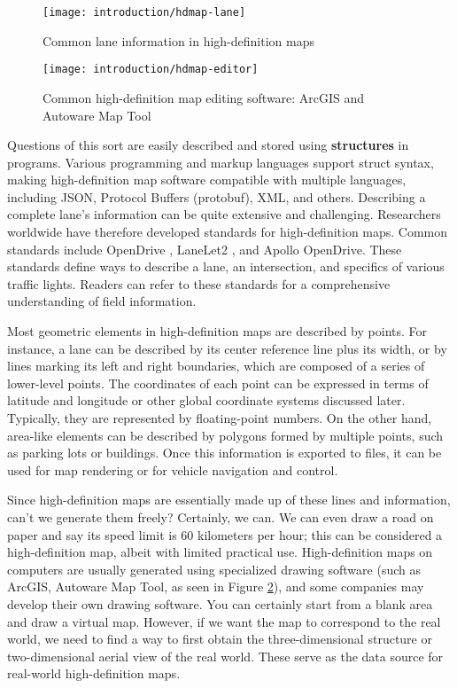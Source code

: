 \begin{figure}[!t]
	\centering
	\texttt{[image: introduction/hdmap-lane]}
	\caption{Common lane information in high-definition maps}
	\label{fig:hdmap-lane}
\end{figure}

\begin{figure}[!t]
	\centering
	\texttt{[image: introduction/hdmap-editor]}
	\caption{Common high-definition map editing software: ArcGIS and Autoware Map Tool}
	\label{fig:hdmap-editor}
\end{figure}

Questions of this sort are easily described and stored using \textbf{structures} in programs. Various programming and markup languages support struct syntax, making high-definition map software compatible with multiple languages, including JSON, Protocol Buffers (protobuf), XML, and others. Describing a complete lane's information can be quite extensive and challenging. Researchers worldwide have therefore developed standards for high-definition maps. Common standards include OpenDrive \cite{Dupuis2010}, LaneLet2 \cite{Poggenhans2018}, and Apollo OpenDrive. These standards define ways to describe a lane, an intersection, and specifics of various traffic lights. Readers can refer to these standards for a comprehensive understanding of field information.

Most geometric elements in high-definition maps are described by points. For instance, a lane can be described by its center reference line plus its width, or by lines marking its left and right boundaries, which are composed of a series of lower-level points. The coordinates of each point can be expressed in terms of latitude and longitude or other global coordinate systems discussed later. Typically, they are represented by floating-point numbers. On the other hand, area-like elements can be described by polygons formed by multiple points, such as parking lots or buildings. Once this information is exported to files, it can be used for map rendering or for vehicle navigation and control.

Since high-definition maps are essentially made up of these lines and information, can't we generate them freely? Certainly, we can. We can even draw a road on paper and say its speed limit is 60 kilometers per hour; this can be considered a high-definition map, albeit with limited practical use. High-definition maps on computers are usually generated using specialized drawing software (such as ArcGIS, Autoware Map Tool, as seen in Figure \ref{fig:hdmap-editor}), and some companies may develop their own drawing software. You can certainly start from a blank area and draw a virtual map. However, if we want the map to correspond to the real world, we need to find a way to first obtain the three-dimensional structure or two-dimensional aerial view of the real world. These serve as the data source for real-world high-definition maps.

